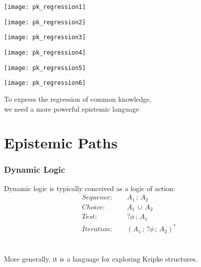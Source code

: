 \documentclass[compress]{beamer}
\begin{document}
\begin{frame}
\begin{center}
  \texttt{[image: pk\_regression1]}
\end{center}
\end{frame}

\begin{frame}
\begin{center}
  \texttt{[image: pk\_regression2]}
\end{center}
\end{frame}

\begin{frame}
\begin{center}
  \texttt{[image: pk\_regression3]}
\end{center}
\end{frame}

\begin{frame}
\begin{center}
  \texttt{[image: pk\_regression4]}
\end{center}
\end{frame}

\begin{frame}
\begin{center}
  \texttt{[image: pk\_regression5]}
\end{center}
\end{frame}

\begin{frame}
\begin{center}
  \texttt{[image: pk\_regression6]}
\end{center}
\end{frame}

\begin{frame}
\centering To express the regression of common knowledge,\\
we need a more powerful epistemic language \\
\end{frame}

\section{Epistemic Paths}

\begin{frame}
\frametitle{Dynamic Logic}
Dynamic logic is typically conceived as a logic of action:
\begin{align*}
Sequence: & \,\,\,\,\,\,\, A_1\,;\,A_2 \\
Choice: & \,\,\,\,\,\,\, A_1\,\cup\,A_2 \\
Test: & \,\,\,\,\,\,\, ?\phi\,;\,A_1 \\
Iteration: &  \,\,\,\,\,\,\, (A_1\,;\,?\phi\,;\,A_2)^*
\end{align*}
\ \\
\ \\
\pause
More generally, it is a language for exploring Kripke structures.
\end{frame}
\end{document}
